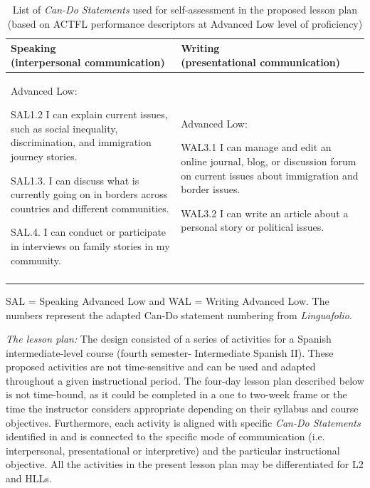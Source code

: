 \documentclass[output=paper]{langscibook}
\begin{document}
\begin{table}
\caption{List of \textit{Can-Do Statements} used for self-assessment in the proposed lesson plan (based on ACTFL performance descriptors at Advanced Low level of proficiency)}
\label{tab:3:4}
\begin{tabularx}{\textwidth}{QQ}
\lsptoprule
{ Speaking\newline (interpersonal communication)} & { Writing\newline  (presentational communication)} \\

\midrule

{ Advanced Low:}\medskip

SAL1.2 I can explain current issues, such as social inequality, discrimination, and immigration journey stories.\medskip

SAL1.3. I can discuss what is currently going on in borders across countries and different communities.\medskip

SAL.4. I can conduct or participate in interviews on family stories in my community. &

{ Advanced Low:}\medskip

WAL3.1 I can manage and edit an online journal, blog, or discussion forum on current issues about immigration and border issues.\medskip

WAL3.2 I can write an article about a personal story or political issues. \\

\lspbottomrule
\end{tabularx}
\parbox{\textwidth}{\footnotesize SAL = Speaking Advanced Low and WAL = Writing Advanced Low. The numbers represent the adapted Can-Do statement numbering from \textit{Linguafolio}.}
\end{table}

\textit{The lesson plan:} The design consisted of a series of activities for a Spanish intermediate-level course (fourth semester- Intermediate Spanish II). These proposed activities are not time-sensitive and can be used and adapted throughout a given instructional period. The four-day lesson plan described below is not time-bound, as it could be completed in a one to two-week frame or the time the instructor considers appropriate depending on their syllabus and course objectives. Furthermore, each activity is aligned with specific \textit{Can-Do Statements} identified in  and is connected to the specific mode of communication (i.e. interpersonal, presentational or interpretive) and the particular instructional objective. All the activities in the present lesson plan may be differentiated for L2 and HLLs.
\end{document}
